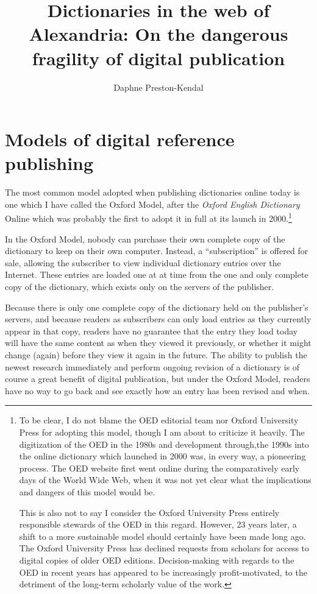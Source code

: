 \documentclass[output=paper]{langscibook}
\author{Daphne Preston-Kendal\affiliation{Humboldt-Universität zu Berlin}}
\title[On the dangerous fragility of digital publication]
      {Dictionaries in the web of Alexandria: On the dangerous fragility of digital publication}
\begin{document}
 
\maketitle

\section{Models of digital reference publishing}\label{models-of-digital-reference-publishing}

The most common model adopted when publishing dictionaries online today
is one which I have called the Oxford Model, after the \emph{Oxford
English Dictionary} Online which was probably the first to adopt it in
full at its launch in 2000.\footnote{To be clear, I do not blame the
OED editorial team nor Oxford University Press for adopting this model, though I am about to criticize it heavily. The digitization of the OED in the 1980s and development through,the 1990s into the online dictionary which launched in 2000 was, in every way, a pioneering process. The OED website first went online during the comparatively early days of the World Wide Web, when it was not yet clear what the implications and dangers of this model would be.

This is also not to say I consider the Oxford University Press entirely responsible stewards of the OED in this regard. However, 23 years later, a shift to a more sustainable model should certainly have been made long ago. The Oxford University Press has declined requests from scholars for access to digital copies of older OED editions. Decision-making with regards to the OED in recent years has appeared to be increasingly profit-motivated, to the detriment of the long-term scholarly value of the work.}

In the Oxford Model, nobody can purchase their own complete copy of the
dictionary to keep on their own computer. Instead, a “subscription” is
offered for sale, allowing the subscriber to view individual dictionary
entries over the Internet. These entries are loaded one at at time from
the one and only complete copy of the dictionary, which exists only on
the servers of the publisher.

Because there is only one complete copy of the dictionary held on the
publisher's servers, and because readers as subscribers can only load
entries as they currently appear in that copy, readers have no guarantee
that the entry they load today will have the same content as when they
viewed it previously, or whether it might change (again) before they
view it again in the future. The ability to publish the newest research
immediately and perform ongoing revision of a dictionary is of course a
great benefit of digital publication, but under the Oxford Model,
readers have no way to go back and see exactly how an entry has been
revised and when.
\end{document}
